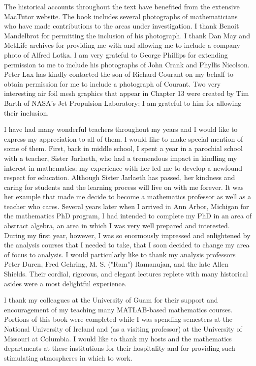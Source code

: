 \documentclass{book}
\begin{document}
The historical accounts throughout the text have benefited from the extensive
MacTutor website. The book includes several photographs of mathematicians
who have made contributions to the areas under investigation. I thank Benoit
Mandelbrot for permitting the inclusion of his photograph. I thank Dan May and
MetLife archives for providing me with and allowing me to include a company
photo of Alfred Lotka. I am very grateful to George Phillips for extending
permission to me to include his photographs of John Crank and Phyllis Nicolson.
Peter Lax has kindly contacted the son of Richard Courant on my behalf to obtain permission for me to include a photograph of Courant. Two very interesting air
foil mesh graphics that appear in Chapter 13 were created by Tim Barth of
NASA's Jet Propulsion Laboratory; I am grateful to him for allowing their
inclusion. 

I have had many wonderful teachers throughout my years and I would like to
express my appreciation to all of them. I would like to make special mention of
some of them. First, back in middle school, I spent a year in a parochial school
with a teacher, Sister Jarlaeth, who had a tremendous impact in kindling my
interest in mathematics; my experience with her led me to develop a newfound
respect for education. Although Sister Jarlaeth has passed, her kindness and
caring for students and the learning process will live on with me forever. It was
her example that made me decide to become a mathematics professor as well as a
teacher who cares. Several years later when I arrived in Ann Arbor, Michigan for
the mathematics PhD program, I had intended to complete my PhD in an area of
abstract algebra, an area in which I was very well prepared and interested. During
my first year, however, I was so enormously impressed and enlightened by the
analysis courses that I needed to take, that I soon decided to change my area of
focus to analysis. I would particularly like to thank my analysis professors Peter
Duren, Fred Gehring, M. S. ("Ram") Ramanujan, and the late Allen Shields. Their
cordial, rigorous, and elegant lectures replete with many historical asides were a
most delightful experience. 

I thank my colleagues at the University of Guam for their support and
encouragement of my teaching many MATLAB-based mathematics courses.
Portions of this book were completed while I was spending semesters at the
National University of Ireland and (as a visiting professor) at the University of
Missouri at Columbia. I would like to thank my hosts and the mathematics
departments at these institutions for their hospitality and for providing such
stimulating atmospheres in which to work.
\end{document}
